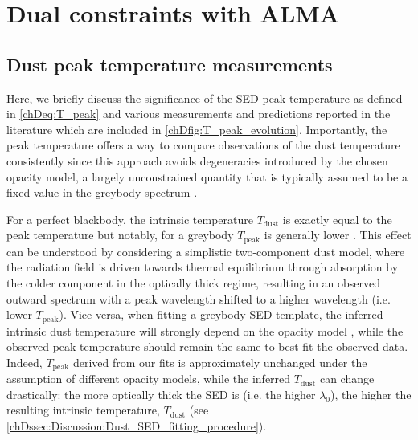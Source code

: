 \chapter{Dual constraints with ALMA}
\label{app:Dual constraints with ALMA}



\section{Dust peak temperature measurements}
\label{appDsec:Dust peak temperature measurements}

Here, we briefly discuss the significance of the SED peak temperature as defined in \cref{chDeq:T_peak} and various measurements and predictions reported in the literature which are included in \cref{chDfig:T_peak_evolution}. Importantly, the peak temperature offers a way to compare observations of the dust temperature consistently since this approach avoids degeneracies introduced by the chosen opacity model, a largely unconstrained quantity that is typically assumed to be a fixed value in the greybody spectrum \citep[e.g.][]{2014PhR...541...45C}.

For a perfect blackbody, the intrinsic temperature $T_\text{dust}$ is exactly equal to the peak temperature but notably, for a greybody $T_\text{peak}$ is generally lower \citep{2012MNRAS.425.3094C}. This effect can be understood by considering a simplistic two-component dust model, where the radiation field is driven towards thermal equilibrium through absorption by the colder component in the optically thick regime, resulting in an observed outward spectrum with a peak wavelength shifted to a higher wavelength (i.e. lower $T_\text{peak}$). Vice versa, when fitting a greybody SED template, the inferred intrinsic dust temperature will strongly depend on the opacity model \citep[e.g.][]{2020A&A...634L..14C}, while the observed peak temperature should remain the same to best fit the observed data. Indeed, $T_\text{peak}$ derived from our fits is approximately unchanged under the assumption of different opacity models, while the inferred $T_\text{dust}$ can change drastically: the more optically thick the SED is (i.e. the higher $\lambda_0$), the higher the resulting intrinsic temperature, $T_\text{dust}$ (see \cref{chDssec:Discussion:Dust_SED_fitting_procedure}).

